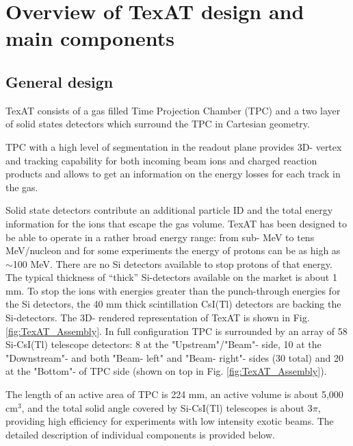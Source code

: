 \documentclass[final,number,sort&compress,5p,times,twocolumn]{elsarticle}
\begin{document}
\section{Overview of TexAT design and main components}
	
\subsection{General design}
		
TexAT consists of a gas filled Time Projection Chamber (TPC)  and a two layer of solid states detectors which surround the TPC in Cartesian geometry.  		
  	 	
TPC with a high level of segmentation in the readout plane provides 3D- vertex and tracking capability  for both incoming beam ions and charged reaction products and allows to get an information on the energy losses for each track in the gas.
		
Solid state detectors contribute an additional particle ID and the total energy information for the ions that escape the gas volume. TexAT has been designed to be able to operate in a rather broad energy range:  from sub- MeV to tens MeV/nucleon and for some experiments the energy of protons can be as high as $\sim$100 MeV. There are no Si detectors available to stop protons of that energy. The typical thickness of  ``thick''  Si-detectors available on the market  is about 1 mm. To stop the ions with energies greater than the punch-through energies for the Si detectors, the 40 mm thick scintillation CsI(Tl) detectors are backing the Si-detectors. The 3D- rendered representation of  TexAT is shown in Fig.\ref{fig:TexAT_Assembly}. In full configuration TPC is surrounded by an array of 
  58 Si-CsI(Tl) telescope detectors:  8 at the "Upstream"/"Beam"- side, 10 at the "Downstream"-  and both "Beam- left" and "Beam- right"-  sides (30 total)  and 20 at the "Bottom"-  of TPC side (shown on top in Fig. \ref{fig:TexAT_Assembly}).
		
The length of an active area of TPC is 224 mm, an active volume is about 5,000 cm$^3$, and the total solid angle covered by Si-CsI(Tl) telescopes is about 3$\pi$, providing high efficiency for experiments with low intensity exotic beams. The detailed description of individual components is provided below.
\end{document}
